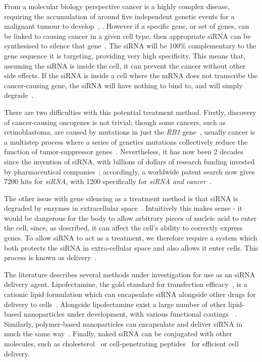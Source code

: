 From a molecular biology perspective cancer is a highly complex disease, requiring the accumulation of around five independent genetic events for a malignant tumour to develop~\cite[\textit{ch. 9}]{murray1993cell}, \cite[\textit{ch. 6}]{knowles2005introduction}. 
However if a specific gene, or set of genes, can be linked to causing cancer in a given cell type, then appropriate siRNA can be synthesised to silence that gene~\cite{dorsett2004sirnas}. 
The siRNA will be 100\% complementary to the gene sequence it is targeting, providing very high specificity. 
This means that, assuming the siRNA is inside the cell, it can prevent the cancer without other side effects. 
If the siRNA is inside a cell where the mRNA does not transcribe the cancer-causing gene, the siRNA will have nothing to bind to, and will simply degrade~\cite{dorsett2004sirnas}.

There are two difficulties with this potential treatment method. 
Firstly, discovery of cancer-causing oncogenes is not trivial; though some cancers, such as retinoblastoma, are caused by mutations in just the \textit{RB1} gene~\cite{chial2008tumor}, usually cancer is a multistep process where a series of genetics mutations collectively reduce the function of tumor-suppressor genes~\cite[\textit{ch. 9}]{murray1993cell}\cite[\textit{ch. 24}]{lodish1999molecular}. 
Nevertheless, it has now been 2 decades since the invention of siRNA, with billions of dollars of research funding invested by pharmaceutical companies~\cite{chakraborty2017therapeutic}; accordingly, a worldwide patent search now gives \num{7200} hits for \textit{siRNA}, with \num{1200} specifically for \textit{siRNA and cancer}~\cite{sirnapatent}. 

The other issue with gene silencing as a treatment method is that siRNA is degraded by enzymes in extracellular space~\cite{dorsett2004sirnas}.
Intuitively this makes sense - it would be dangerous for the body to allow arbitrary pieces of nucleic acid to enter the cell, since, as described, it can affect the cell's ability to correctly express genes. 
To allow siRNA to act as a treatment, we therefore require a system which both protects the siRNA in extra-cellular space and also allows it enter cells. 
This process is known as delivery~\cite{tiwari2012drug}.

The literature describes several methods under investigation for use as an siRNA delivery agent.
Lipofectamine, the gold standard for transfection efficacy~\cite{thermolipofectamine}, is a cationic lipid formulation which can encapsulate siRNA alongside other drugs for delivery to cells~\cite{liu2017efficient}. 
Alongside lipofectamine exist a large number of other lipid-based nanoparticles under development, with various functional coatings ~\cite{xu2015delivery}. %
Similarly, polymer-based nanoparticles can encapsulate and deliver siRNA in much the same way~\cite{sahoo2003nanotech, wang2009advances}. 
Finally, naked siRNA can be conjugated with other molecules, such as cholesterol~\cite{soutschek2004therapeutic} or cell-penetrating peptides~\cite{chiu2004visualizing} for efficient cell delivery. 


